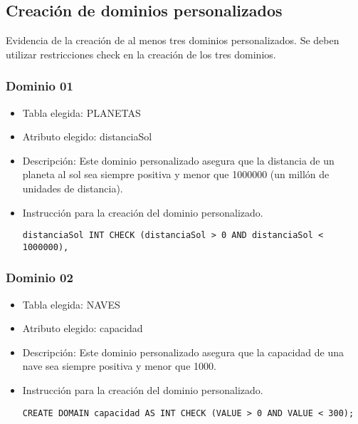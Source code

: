 \subsection{Creación de dominios personalizados}

Evidencia de la creación de al menos tres dominios personalizados. Se deben utilizar restricciones check en la creación de los tres dominios.

\subsubsection*{Dominio 01}

\begin{itemize} 
  \item Tabla elegida: PLANETAS 
  \item Atributo elegido: distanciaSol 
  \item Descripción: Este dominio personalizado asegura que la distancia de un planeta al sol sea siempre positiva y menor que 1000000 (un millón de unidades de distancia). 
  \item Instrucción para la creación del dominio personalizado. 
  \begin{lstlisting}[caption={Dominio 01}, label={lst:sql_estadios}] 
    distanciaSol INT CHECK (distanciaSol > 0 AND distanciaSol < 1000000),
  \end{lstlisting} 
\end{itemize}

\subsubsection*{Dominio 02}

\begin{itemize} 
  \item Tabla elegida: NAVES 
  \item Atributo elegido: capacidad 
  \item Descripción: Este dominio personalizado asegura que la capacidad de una nave sea siempre positiva y menor que 1000. 
  \item Instrucción para la creación del dominio personalizado. 
    \begin{lstlisting}[caption={Dominio 02}, label={lst:sql_estadios}] 
    CREATE DOMAIN capacidad AS INT CHECK (VALUE > 0 AND VALUE < 300); 
    \end{lstlisting} 
\end{itemize}


